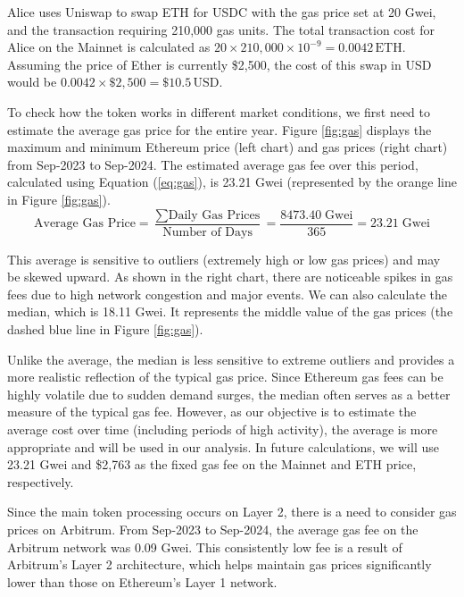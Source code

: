 \begin{example}
	Alice uses Uniswap to swap ETH for USDC with the gas price set at 20 Gwei, and the transaction requiring 210,000 gas units. The total transaction cost for Alice on the Mainnet is calculated as \(20 \times 210,000 \times 10^{-9} = 0.0042 \, \text{ETH}\). Assuming the price of Ether is currently \$2,500, the cost of this swap in USD would be \(0.0042 \times \$2,500 = \$10.5 \, \text{USD}\).
\end{example}

To check how the token works in different market conditions, we first need to estimate the average gas price for the entire year. Figure \ref{fig:gas} displays the maximum and minimum Ethereum price (left chart) and gas prices (right chart) from Sep-2023 to Sep-2024. The estimated average gas fee over this period, calculated using Equation (\ref{eq:gas}), is 23.21 Gwei (represented by the orange line in Figure \ref{fig:gas}).
\small{
	\begin{equation}\label{eq:gas}
		\text{Average Gas Price} = \frac{\sum \text{Daily Gas Prices}}{\text{Number of Days}} = \frac{8473.40\; \text{Gwei}}{365} = 23.21\; \text{Gwei}
	\end{equation}
}\normalsize

This average is sensitive to outliers (extremely high or low gas prices) and may be skewed upward. As shown in the right chart, there are noticeable spikes in gas fees due to high network congestion and major events. We can also calculate the median, which is 18.11 Gwei. It represents the middle value of the gas prices (the dashed blue line in Figure \ref{fig:gas}). 

Unlike the average, the median is less sensitive to extreme outliers and provides a more realistic reflection of the typical gas price. Since Ethereum gas fees can be highly volatile due to sudden demand surges, the median often serves as a better measure of the typical gas fee. However, as our objective is to estimate the average cost over time (including periods of high activity), the average is more appropriate and will be used in our analysis. In future calculations, we will use 23.21 Gwei and \$2,763 as the fixed gas fee on the Mainnet and ETH price, respectively. 

Since the main token processing occurs on Layer 2, there is a need to consider gas prices on Arbitrum. From Sep-2023 to Sep-2024, the average gas fee on the Arbitrum network was 0.09 Gwei. This consistently low fee is a result of Arbitrum's Layer 2 architecture, which helps maintain gas prices significantly lower than those on Ethereum's Layer 1 network.

